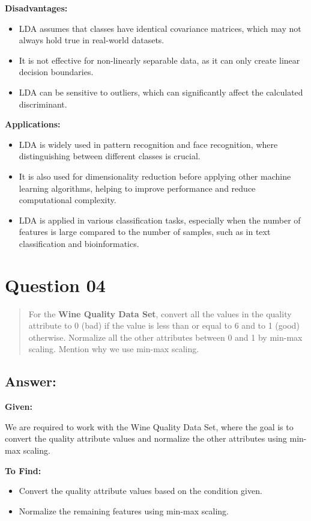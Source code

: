 \documentclass{exam}
\begin{document}
\textbf{Disadvantages:}
\begin{itemize}
    \item LDA assumes that classes have identical covariance matrices, which may not always hold true in real-world datasets.
    \item It is not effective for non-linearly separable data, as it can only create linear decision boundaries.
    \item LDA can be sensitive to outliers, which can significantly affect the calculated discriminant.
\end{itemize}

\textbf{Applications:}
\begin{itemize}
    \item LDA is widely used in pattern recognition and face recognition, where distinguishing between different classes is crucial.
    \item It is also used for dimensionality reduction before applying other machine learning algorithms, helping to improve performance and reduce computational complexity.
    \item LDA is applied in various classification tasks, especially when the number of features is large compared to the number of samples, such as in text classification and bioinformatics.
\end{itemize}


\section{Question 04}

\begin{quote}
For the \textbf{Wine Quality Data Set}, convert all the values in the quality attribute to 0 (bad) if the value is less than or equal to 6 and to 1 (good) otherwise. Normalize all the other attributes between 0 and 1 by min-max scaling. Mention why we use min-max scaling.
\end{quote}

\subsection{Answer:}

\textbf{Given:}

We are required to work with the Wine Quality Data Set, where the goal is to convert the quality attribute values and normalize the other attributes using min-max scaling.

\textbf{To Find:} 
\begin{itemize}
    \item Convert the quality attribute values based on the condition given.
    \item Normalize the remaining features using min-max scaling.
\end{itemize}
\end{document}

